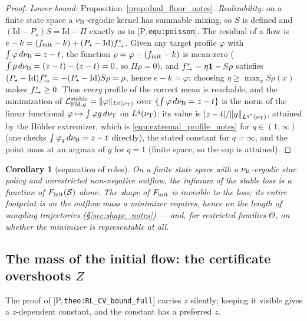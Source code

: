 \documentclass[11pt]{article}
\newtheorem{corollary}[theorem]{Corollary}
\theoremstyle{definition}
\theoremstyle{remark}
\newcommand{\paperref}[1]{[P,\,\texttt{#1}]}   %
\begin{document}
\begin{proof}
\emph{Lower bound:} Proposition~\ref{prop:dual_floor_notes}. \emph{Realizability:} on a finite
state space a $\nu_{\mathrm{B}}$-ergodic kernel has summable mixing, so $S$ is defined and
$(\mathrm{Id}-P_\star)S=\mathrm{Id}-\Pi$ exactly as in \paperref{equ:poisson}. The residual
of a flow is $e-k=(f_{\mathrm{init}}-k)+(P_\star-\mathrm{Id})f^*_{\rightarrow}$. Given any target profile
$\varphi$ with $\int\varphi\,d\nu_{\mathrm{B}}=z-t$, the function $\rho=\varphi-(f_{\mathrm{init}}-k)$ is
mean-zero ($\int\rho\,d\nu_{\mathrm{B}}=(z-t)-(z-t)=0$, so $\Pi\rho=0$), and
$f^*_{\rightarrow}=\eta\mathbf 1-S\rho$ satisfies
$(P_\star-\mathrm{Id})f^*_{\rightarrow}=-(P_\star-\mathrm{Id})S\rho=\rho$, hence $e-k=\varphi$;
choosing $\eta\geq\max_xS\rho(x)$ makes $f^*_{\rightarrow}\geq0$. Thus \emph{every} profile of the
correct mean is reachable, and the minimization of $\mathcal L_{\mathrm{FM},q}^{\mathrm{stable}}=\|\varphi\|_{L^q(\nu_{\mathrm{T}})}$
over $\{\int\varphi\,d\nu_{\mathrm{B}}=z-t\}$ is the norm of the linear functional
$\varphi\mapsto\int\varphi g\,d\nu_{\mathrm{T}}$ on $L^q(\nu_{\mathrm{T}})$: its value is
$|z-t|/\|g\|_{L^{q^*}(\nu_{\mathrm{T}})}$, attained by the H\"older extremizer, which is
\eqref{equ:extremal_profile_notes} for $q\in(1,\infty)$ (one checks
$\int\varphi_q\,d\nu_{\mathrm{B}}=z-t$ directly), the stated constant for $q=\infty$, and the point
mass at an argmax of $g$ for $q=1$ (finite space, so the sup is attained).
\end{proof}

\begin{corollary}[separation of roles]\label{cor:separation_notes}
On a finite state space with a $\nu_{\mathrm{B}}$-ergodic star policy and unrestricted non-negative
outflow, the infimum of the stable loss is a function of $F_{\mathrm{init}}(\mathcal S)$ alone. The
shape of $F_{\mathrm{init}}$ is invisible to the loss; its entire footprint is on the \emph{outflow
mass} a minimizer requires, hence on the length of sampling trajectories
(\S\ref{sec:shape_notes}) --- and, for restricted families $\Theta$, on whether the minimizer is
representable at all.
\end{corollary}

\subsection{The mass of the initial flow: the certificate overshoots $Z$}\label{sec:mass_notes}

The proof of \paperref{theo:RL\_CV\_bound\_full} carries $z$ silently; keeping it visible
gives a $z$-dependent constant, and the constant has a preferred $z$.
\end{document}
